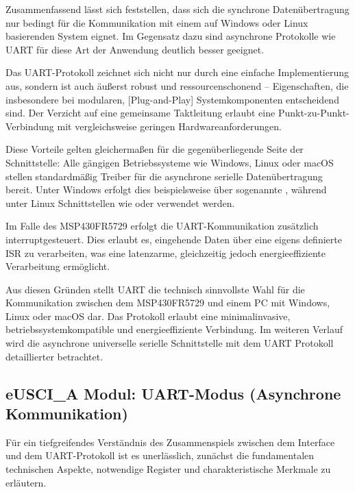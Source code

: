 Zusammenfassend l\"asst sich feststellen, dass sich die synchrone Daten\"ubertragung nur bedingt f\"ur die Kommunikation mit einem auf Windows oder Linux basierenden System eignet. Im Gegensatz dazu sind asynchrone Protokolle wie UART f\"ur diese Art der Anwendung deutlich besser geeignet. 

Das UART-Protokoll zeichnet sich nicht nur durch eine einfache Implementierung aus, sondern ist auch \"au{\ss}erst robust und ressourcenschonend -- Eigenschaften, die insbesondere bei modularen, [Plug-and-Play] Systemkomponenten entscheidend sind. Der Verzicht auf eine gemeinsame Taktleitung erlaubt eine Punkt-zu-Punkt-Verbindung mit vergleichsweise geringen Hardwareanforderungen. 

Diese Vorteile gelten gleicherma{\ss}en f\"ur die gegen\"uberliegende Seite der Schnittstelle: Alle g\"angigen Betriebssysteme wie Windows, Linux oder macOS stellen standardm\"aßig Treiber f\"ur die asynchrone serielle Daten\"ubertragung bereit. Unter Windows erfolgt dies beispielsweise \"uber sogenannte , w\"ahrend unter Linux Schnittstellen wie  oder  verwendet werden.

Im Falle des MSP430FR5729 erfolgt die UART-Kommunikation zus\"atzlich interruptgesteuert. Dies erlaubt es, eingehende Daten \"uber eine eigens definierte ISR zu verarbeiten, was eine latenzarme, gleichzeitig jedoch energieeffiziente Verarbeitung erm\"oglicht.

Aus diesen Gr\"unden stellt UART die technisch sinnvollste Wahl f\"ur die Kommunikation zwischen dem MSP430FR5729 und einem PC mit Windows, Linux oder macOS dar. Das Protokoll erlaubt eine minimalinvasive, betriebssystemkompatible und energieeffiziente Verbindung. Im weiteren Verlauf wird die asynchrone universelle serielle Schnittstelle mit dem UART Protokoll detaillierter betrachtet.\AI

\subsection{eUSCI\_A Modul: UART-Modus (Asynchrone Kommunikation)}
\label{eUSCI_UART}

F\"ur ein tiefgreifendes Verst\"andnis des Zusammenspiels zwischen dem Interface und dem UART-Protokoll ist es unerl\"asslich, zun\"achst die fundamentalen technischen Aspekte, notwendige Register und charakteristische Merkmale zu erl\"autern.

